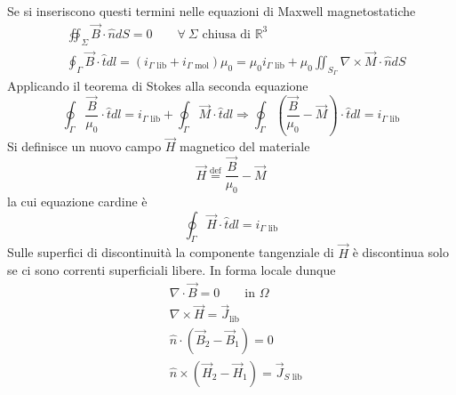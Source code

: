 Se si inseriscono questi termini nelle equazioni di Maxwell magnetostatiche
\begin{align*}
&\oiint_\Sigma \vec{B}\cdot\hat{n}dS = 0 \qquad \forall\ \Sigma\text{ chiusa di }\mathbb{R}^3\\
&\oint_\Gamma \vec{B}\cdot\hat{t} dl = (i_{\Gamma\text{ lib}} + i_{\Gamma\text{ mol}})\mu_0
= \mu_0 i_{\Gamma\text{ lib}} + \mu_0 \iint_{S_\Gamma} \nabla\times\vec{M}\cdot\hat{n}dS
\end{align*}
Applicando il teorema di Stokes alla seconda equazione
$$
\oint_\Gamma \frac{\vec{B}}{\mu_0} \cdot\hat{t}dl = i_{\Gamma\text{ lib}} + \oint_\Gamma \vec{M}\cdot\hat{t}dl \Rightarrow \oint_\Gamma \left(\frac{\vec{B}}{\mu_0} - \vec{M}\right)\cdot\hat{t} dl = i_{\Gamma \text{ lib}}
$$
Si definisce un nuovo campo $\vec{H}$ magnetico del materiale
$$
\vec{H} \stackrel{\text{def}}{=} \frac{\vec{B}}{\mu_0} - \vec{M}
$$
la cui equazione cardine è
$$
\oint_\Gamma \vec{H}\cdot\hat{t} dl = i_{\Gamma\text{ lib}}
$$
Sulle superfici di discontinuità la componente tangenziale di $\vec{H}$ è discontinua
solo se ci sono correnti superficiali libere. In forma locale dunque
\begin{align*}
&\nabla\cdot\vec{B} = 0 \qquad \text{in } \Omega\\
&\nabla\times\vec{H} = \vec{J}_\text{lib} \\
&\hat{n} \cdot (\vec{B}_2-\vec{B}_1) = 0\\
&\hat{n} \times (\vec{H}_2 - \vec{H}_1) = \vec{J}_{S\text{ lib}}
\end{align*}
